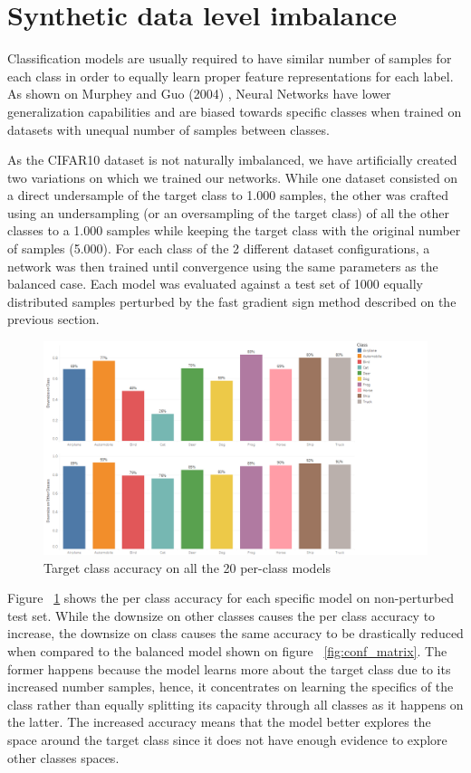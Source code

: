 \section{Synthetic data level imbalance}

Classification models are usually required to have similar number of samples for each class in order to equally learn proper feature representations for each label. As shown on Murphey and Guo (2004) \cite{murphey2004}, Neural Networks have lower generalization capabilities and are biased towards specific classes when trained on datasets with unequal number of samples between classes. 

As the CIFAR10 dataset is not naturally imbalanced, we have artificially created two variations on which we trained our networks.  While one dataset consisted on a direct undersample of the target class to 1.000 samples, the other was crafted using  an undersampling (or an oversampling of the target class) of all the other classes to a 1.000 samples while keeping the target class with the original number of samples (5.000). For each class of the 2 different dataset configurations, a network was then trained until convergence using the same parameters as the balanced case. Each model was evaluated against a test set of 1000 equally distributed samples perturbed by the fast gradient sign method described on the previous section. 

\begin{figure}[!h]
	\centering
	\includegraphics[scale=0.5]{downsize_graph.png}
	\caption{Target class accuracy on all the 20 per-class models}
	\label{fig:acc_graph}
\end{figure}

Figure ~\ref{fig:acc_graph} shows the per class accuracy for each specific model on non-perturbed test set. While the downsize on other classes causes the per class accuracy to increase, the downsize on class causes the same accuracy to be drastically reduced when compared to the balanced model shown on figure ~\ref{fig:conf_matrix}. The former happens because the model learns more about the target class due to its increased number samples, hence, it concentrates on learning the specifics of the class rather than equally splitting its capacity through all classes as it happens on the latter. The increased accuracy means that the model better explores the space around the target class since it does not have enough evidence to explore other classes spaces.

